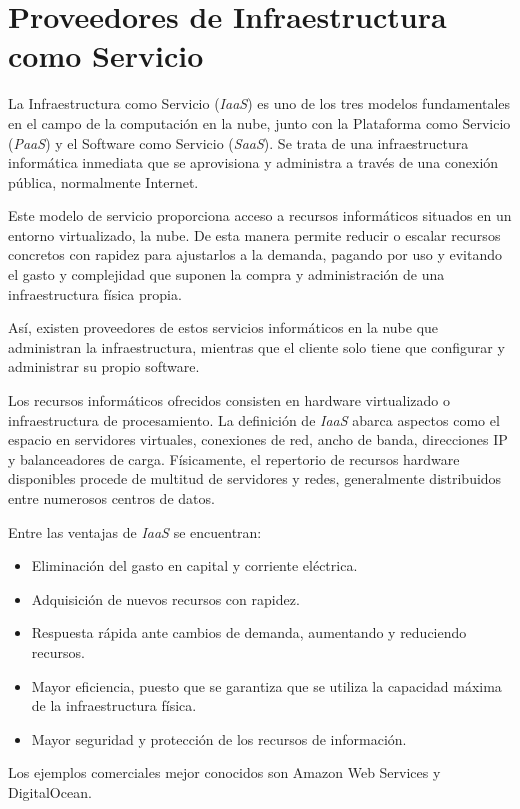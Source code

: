 \section{Proveedores de Infraestructura como Servicio}

La Infraestructura como Servicio (\textit{IaaS}) es uno de los tres modelos fundamentales en el campo de la computación en la nube, junto con la Plataforma como Servicio (\textit{PaaS}) y el Software como Servicio (\textit{SaaS}). Se trata de una infraestructura informática inmediata que se aprovisiona y administra a través de una conexión pública, normalmente Internet.

Este modelo de servicio proporciona acceso a recursos informáticos situados en un entorno virtualizado, la nube. De esta manera permite reducir o escalar recursos  concretos con rapidez para ajustarlos a la demanda, pagando por uso y evitando el gasto y complejidad que suponen la compra y administración de una infraestructura física propia.

Así, existen proveedores de estos servicios informáticos en la nube que administran la infraestructura, mientras que el cliente solo tiene que configurar y administrar su propio software.

Los recursos informáticos ofrecidos consisten en hardware virtualizado o infraestructura de procesamiento. La definición de \textit{IaaS} abarca aspectos como el espacio en servidores virtuales, conexiones de red, ancho de banda, direcciones IP y balanceadores de carga. Físicamente, el repertorio de recursos hardware disponibles procede de multitud de servidores y redes, generalmente distribuidos entre numerosos centros de datos.

Entre las ventajas de \textit{IaaS} se encuentran:
\begin{itemize}
\item Eliminación del gasto en capital y corriente eléctrica.
\item Adquisición de nuevos recursos con rapidez.
\item Respuesta rápida ante cambios de demanda, aumentando y reduciendo recursos.
\item Mayor eficiencia, puesto que se garantiza que se utiliza la capacidad máxima de la infraestructura física.
\item Mayor seguridad y protección de los recursos de información.
\end{itemize}

Los ejemplos comerciales mejor conocidos son Amazon Web Services y DigitalOcean.

